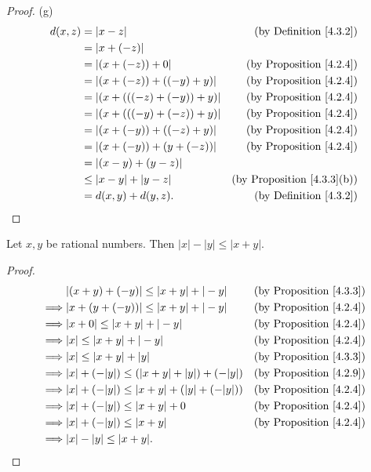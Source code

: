 \begin{proof}{(g)}
\begin{align*}
d(x, z) &= |x - z| & \text{(by Definition \ref{4.3.2})} \\
&= |x + (-z)| \\
&= |(x + (-z)) + 0| & \text{(by Proposition \ref{4.2.4})} \\
&= |(x + (-z)) + ((-y) + y)| & \text{(by Proposition \ref{4.2.4})} \\
&= |(x + (((-z) + (-y)) + y)| & \text{(by Proposition \ref{4.2.4})} \\
&= |(x + (((-y) + (-z)) + y)| & \text{(by Proposition \ref{4.2.4})} \\
&= |(x + (-y)) + ((-z) + y)| & \text{(by Proposition \ref{4.2.4})} \\
&= |(x + (-y)) + (y + (-z))| & \text{(by Proposition \ref{4.2.4})} \\
&= |(x - y) + (y - z)| \\
&\leq |x - y| + |y - z| & \text{(by Proposition \ref{4.3.3}(b))} \\
&= d(x, y) + d(y, z). & \text{(by Definition \ref{4.3.2})} \\
\end{align*}
\end{proof}

\begin{additional corollary}\label{ac 4.3.1}
Let \(x, y\) be rational numbers.
Then \(|x| - |y| \leq |x + y|\).
\end{additional corollary}

\begin{proof}
\begin{align*}
& |(x + y) + (-y)| \leq |x + y| + |-y| & \text{(by Proposition \ref{4.3.3})} \\
\implies & |x + (y + (-y))| \leq |x + y| + |-y|& \text{(by Proposition \ref{4.2.4})} \\
\implies & |x + 0| \leq |x + y| + |-y|& \text{(by Proposition \ref{4.2.4})} \\
\implies & |x| \leq |x + y| + |-y|& \text{(by Proposition \ref{4.2.4})} \\
\implies & |x| \leq |x + y| + |y|& \text{(by Proposition \ref{4.3.3})} \\
\implies & |x| + (-|y|) \leq (|x + y| + |y|) + (-|y|) & \text{(by Proposition \ref{4.2.9})} \\
\implies & |x| + (-|y|) \leq |x + y| + (|y| + (-|y|)) & \text{(by Proposition \ref{4.2.4})} \\
\implies & |x| + (-|y|) \leq |x + y| + 0 & \text{(by Proposition \ref{4.2.4})} \\
\implies & |x| + (-|y|) \leq |x + y| & \text{(by Proposition \ref{4.2.4})} \\
\implies & |x| - |y| \leq |x + y|.
\end{align*}
\end{proof}

